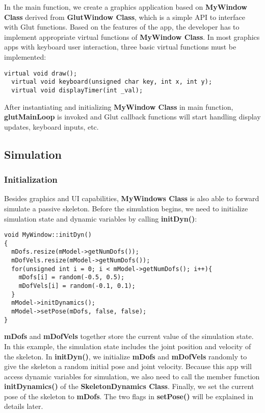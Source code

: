In the main function, we create a graphics application based on
\textbf{MyWindow Class} derived from \textbf{GlutWindow Class}, which
is a simple API to interface with Glut functions. Based on the
features of the app, the developer has to implement appropriate
virtual functions of \textbf{MyWindow Class}. In most graphics apps
with keyboard user interaction, three basic virtual functions must be
implemented:

\ttfamily
\begin{lstlisting}[caption=MyWindow.h]
  virtual void draw();
  virtual void keyboard(unsigned char key, int x, int y);
  virtual void displayTimer(int _val);
\end{lstlisting}
\rmfamily 

After instantiating and initializing \textbf{MyWindow Class} in main
function, \textbf{glutMainLoop} is invoked and Glut callback functions
will start handling display updates, keyboard inputs, etc.

\subsection{Simulation}
\subsubsection{Initialization}
Besides graphics and UI capabilities, \textbf{MyWindows Class} is also
able to forward simulate a passive skeleton. Before the simulation
begins, we need to initialize simulation state and dynamic variables
by calling \textbf{initDyn()}:

\ttfamily
\begin{lstlisting}[caption=MyWindow.cpp]
void MyWindow::initDyn()
{
  mDofs.resize(mModel->getNumDofs());
  mDofVels.resize(mModel->getNumDofs());
  for(unsigned int i = 0; i < mModel->getNumDofs(); i++){
    mDofs[i] = random(-0.5, 0.5);
    mDofVels[i] = random(-0.1, 0.1);
  }
  mModel->initDynamics();
  mModel->setPose(mDofs, false, false);
}
\end{lstlisting}
\rmfamily 

\textbf{mDofs} and \textbf{mDofVels} together store the current value
of the simulation state. In this example, the simulation state
includes the joint position and velocity of the skeleton. In
\textbf{initDyn()}, we initialize \textbf{mDofs} and \textbf{mDofVels}
randomly to give the skeleton a random initial pose and joint
velocity. Because this app will access dynamic variables for
simulation, we also need to call the member function
\textbf{initDynamics()} of the \textbf{SkeletonDynamics
  Class}. Finally, we set the current pose of the skeleton to
\textbf{mDofs}. The two flags in \textbf{setPose()} will be explained
in details later.

